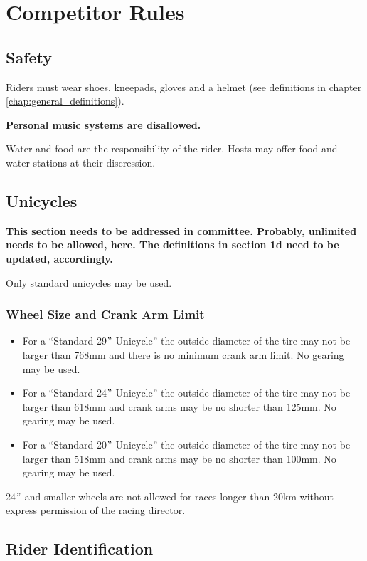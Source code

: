 
\chapter{Competitor Rules}

\section{Safety}
Riders must wear shoes, kneepads, gloves and a helmet (see definitions in chapter \ref{chap:general_definitions}).

\textbf{Personal music systems are disallowed.}

Water and food are the responsibility of the rider. Hosts may offer food and water stations at their discression.

\section{Unicycles}

\textbf{This section needs to be addressed in committee.  Probably, unlimited needs to be allowed, here.  The definitions in section 1d need to be updated, accordingly.}

Only standard unicycles may be used.
\subsection{Wheel Size and Crank Arm Limit}
\begin{itemize}
\item For a ``Standard 29$"$ Unicycle'' the outside diameter of the tire may not be larger than 768mm and there is no minimum crank arm limit.
No gearing may be used.
\item For a ``Standard 24$"$ Unicycle'' the outside diameter of the tire may not be larger than 618mm and crank arms may be no shorter than 125mm.
No gearing may be used.
\item For a ``Standard 20$"$ Unicycle'' the outside diameter of the tire may not be larger than 518mm and crank arms may be no shorter than 100mm.
No gearing may be used.
\end{itemize}

24$"$ and smaller wheels are not allowed for races longer than 20km without express permission of the racing director.

\section{Rider Identification}

